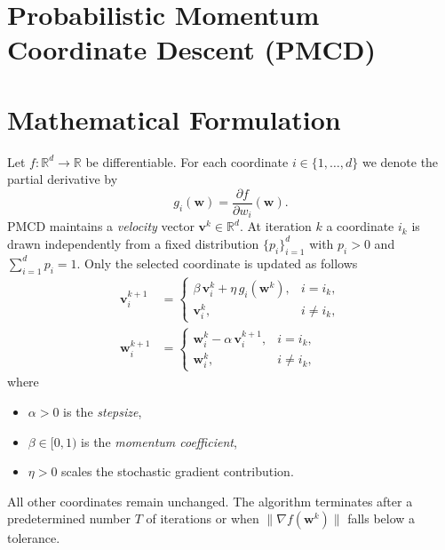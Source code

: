 \documentclass[11pt]{article}
\newcommand{\R}{\mathbb{R}}
\begin{document}
\section*{Probabilistic Momentum Coordinate Descent (PMCD)}

\section*{Mathematical Formulation}
Let $f:\R^{d}\to\R$ be differentiable.  
For each coordinate $i\in\{1,\dots,d\}$ we denote the partial derivative by 
\[
g_i(\mathbf w)=\frac{\partial f}{\partial w_i}(\mathbf w).
\]
PMCD maintains a \emph{velocity} vector $\mathbf v^{k}\in\R^{d}$.
At iteration $k$ a coordinate $i_k$ is drawn independently from a fixed
distribution $\{p_i\}_{i=1}^{d}$ with $p_i>0$ and $\sum_{i=1}^{d}p_i=1$.
Only the selected coordinate is updated as follows
\[
\begin{aligned}
\mathbf v^{k+1}_i &=
\begin{cases}
\beta \,\mathbf v^{k}_i + \eta\, g_i(\mathbf w^{k}), & i=i_k,\\[4pt]
\mathbf v^{k}_i, & i\neq i_k,
\end{cases} \\
\mathbf w^{k+1}_i &=
\begin{cases}
\mathbf w^{k}_i - \alpha \,\mathbf v^{k+1}_i, & i=i_k,\\[4pt]
\mathbf w^{k}_i, & i\neq i_k,
\end{cases}
\end{aligned}
\tag{1}
\]
where 
\begin{itemize}
  \item $\alpha>0$ is the \emph{stepsize},
  \item $\beta\in[0,1)$ is the \emph{momentum coefficient},
  \item $\eta>0$ scales the stochastic gradient contribution.
\end{itemize}
All other coordinates remain unchanged.
The algorithm terminates after a predetermined number $T$ of iterations
or when $\|\nabla f(\mathbf w^{k})\|$ falls below a tolerance.
\end{document}
